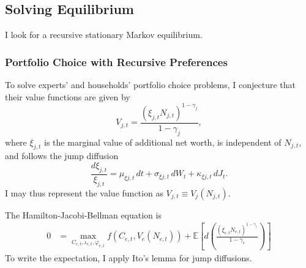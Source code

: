 \documentclass[12 pt, oneside]{article}
\theoremstyle{definition}
\theoremstyle{definition}
\theoremstyle{definition}
\newcommand{\E}{\mathbb{E}}
\begin{document}
\subsection{Solving Equilibrium}
I look for a recursive stationary Markov equilibrium.

\subsubsection{Portfolio Choice with Recursive Preferences}

To solve experts' and households' portfolio choice problems, I conjecture that their value functions are given by
\begin{equation}
  \label{eq:value function power utility form}
  V_{j, t}  = \frac{(\xi_{j, t} N_{j, t})^{ 1- \gamma_j}}{1 - \gamma_j},
\end{equation}
where $\xi_{j, t}$ is the marginal value of additional net worth, is independent of $N_{j, t}$, and follows the jump diffusion
\begin{equation}\label{eq:xi law of motion}
\frac{d\xi_{j, t}}{\xi_{j, t}} = \mu_{\xi j, t}\,dt + \sigma_{\xi j, t} \, dW_t + \kappa_{\xi j, t} \, dJ_t.
\end{equation}
I may thus represent the value function as $V_{j, t}\equiv V_j(N_{j, t})$.

The Hamilton-Jacobi-Bellman equation is
\begin{equation}
\label{eq:hjb unsimplified}
\begin{split}
  0 & = \max_{C_{e, t}, \iota_{e, t}, \varphi_{e, t}}f(C_{e, t}, V_e(N_{e, t})) + \E\left[d\left(\frac{(\xi_{e, t} N_{e, t})^{1 - \gamma_e}}{1 - \gamma_e}\right)\right]
\end{split}
\end{equation}
To write the expectation, I apply Ito's lemma for jump diffusions.
\end{document}
